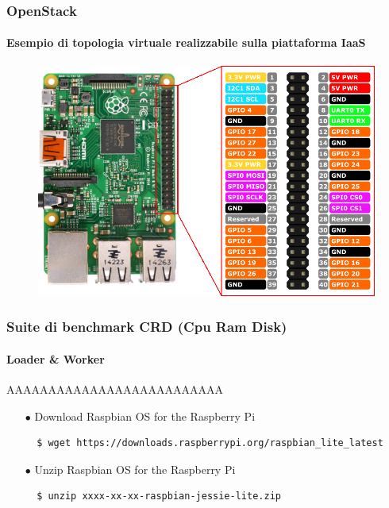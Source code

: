 \documentclass{beamer}
\begin{document}

\begin{frame}
\frametitle{\textbf{OpenStack}}
\framesubtitle{\textbf{Esempio di topologia virtuale realizzabile sulla piattaforma IaaS}}
\begin{figure}
\centering
\includegraphics[scale=1]{imgs/gpio.png}
\end{figure}
\end{frame}


\begin{frame}[fragile]
\frametitle{\textbf{Suite di benchmark CRD (Cpu Ram Disk)}}
\framesubtitle{\textbf{Loader \& Worker}}

\begin{block}{AAAAAAAAAAAAAAAAAAAAAAAAAA}
\begin{itemize}
\item[$\bullet$] Download Raspbian OS for the Raspberry Pi
\begin{lstlisting}
  $ wget https://downloads.raspberrypi.org/raspbian_lite_latest
\end{lstlisting}
\item[$\bullet$] Unzip Raspbian OS for the Raspberry Pi
\begin{lstlisting}
  $ unzip xxxx-xx-xx-raspbian-jessie-lite.zip
\end{lstlisting}
\end{itemize}
\end{block}

\end{frame}

\end{document}

